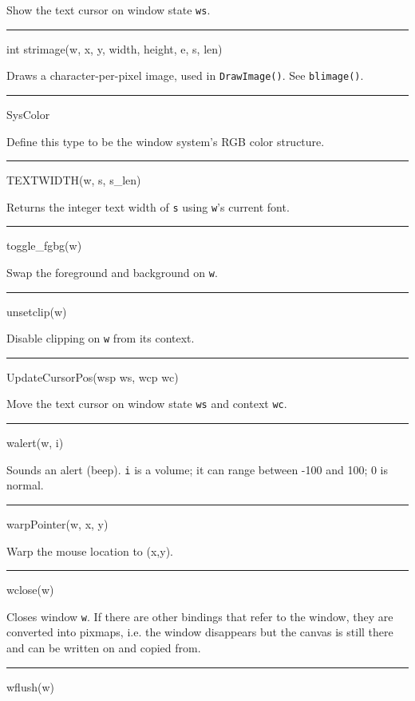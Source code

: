 Show the text cursor on window state \texttt{ws}.


\bigskip\hrule\vspace{0.1cm}
\noindent
int strimage(w, x, y, width, height, e, s, len)


Draws a character-per-pixel image, used in \texttt{DrawImage()}. See
\texttt{blimage()}.


\bigskip\hrule\vspace{0.1cm}
\noindent
SysColor


Define this type to be the window system's RGB color structure.


\bigskip\hrule\vspace{0.1cm}
\noindent
TEXTWIDTH(w, s, s\_len)


Returns the integer text width of \texttt{s} using \texttt{w}{}'s current font.


\bigskip\hrule\vspace{0.1cm}
\noindent
toggle\_fgbg(w)


Swap the foreground and background on \texttt{w}.


\bigskip\hrule\vspace{0.1cm}
\noindent
unsetclip(w)


Disable clipping on \texttt{w} from its context.


\bigskip\hrule\vspace{0.1cm}
\noindent
UpdateCursorPos(wsp ws, wcp wc)


Move the text cursor on window state \texttt{ws} and context \texttt{wc}.


\bigskip\hrule\vspace{0.1cm}
\noindent
walert(w, i)


Sounds an alert (beep). \texttt{i} is a volume; it can range between
-100 and 100; 0 is normal.


\bigskip\hrule\vspace{0.1cm}
\noindent
warpPointer(w, x, y)


Warp the mouse location to (x,y).


\bigskip\hrule\vspace{0.1cm}
\noindent
wclose(w)


Closes window \texttt{w}. If there are other bindings that refer to
the window, they are converted into pixmaps, i.e.  the window
disappears but the canvas is still there and can be written on and
copied from.


\bigskip\hrule\vspace{0.1cm}
\noindent
wflush(w)


